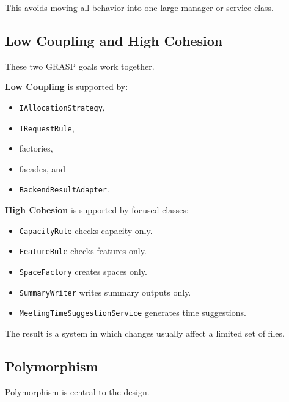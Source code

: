 \documentclass[12pt,a4paper]{article}
\begin{document}
This avoids moving all behavior into one large manager or service class.

\subsection{Low Coupling and High Cohesion}

These two GRASP goals work together.

\textbf{Low Coupling} is supported by:

\begin{itemize}
    \item \texttt{IAllocationStrategy},
    \item \texttt{IRequestRule},
    \item factories,
    \item facades, and
    \item \texttt{BackendResultAdapter}.
\end{itemize}

\textbf{High Cohesion} is supported by focused classes:

\begin{itemize}
    \item \texttt{CapacityRule} checks capacity only.
    \item \texttt{FeatureRule} checks features only.
    \item \texttt{SpaceFactory} creates spaces only.
    \item \texttt{SummaryWriter} writes summary outputs only.
    \item \texttt{MeetingTimeSuggestionService} generates time suggestions.
\end{itemize}

The result is a system in which changes usually affect a limited set of files.

\subsection{Polymorphism}

Polymorphism is central to the design.
\end{document}
